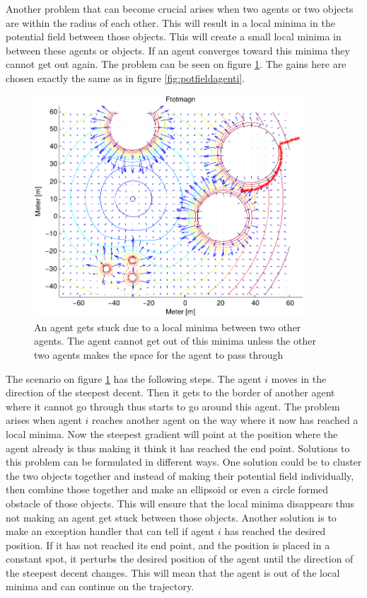 Another problem that can become crucial arises when two agents or two objects are within the radius of each other. This will result in a local minima in the potential field between those objects. This will create a small local minima in between these agents or objects. If an agent converges toward this minima they cannot get out again. The problem can be seen on figure \ref{fig:roevproblem}. The gains here are chosen exactly the same as in figure \ref{fig:potfieldagenti}.
\begin{figure}[htbp]
  \includegraphics[width=0.9\textwidth]{fig/ftotmagnfigpdf3}
  \caption{An agent gets stuck due to a local minima between two other agents. The agent cannot get out of this minima unless the other two agents makes the space for the agent to pass through}
  \label{fig:roevproblem}
\end{figure}
The scenario on figure \ref{fig:roevproblem} has the following steps. The agent $i$ moves in the direction of the steepest decent. Then it gets to the border of another agent where it cannot go through thus starts to go around this agent. The problem arises when agent $i$ reaches another agent on the way where it now has reached a local minima. Now the steepest gradient will point at the position where the agent already is thus making it think it has reached the end point. Solutions to this problem can be formulated in different ways. One solution could be to cluster the two objects together and instead of making their potential field individually, then combine those together and make an ellipsoid or even a circle formed obstacle of those objects. This will ensure that the local minima disappears thus not making an agent get stuck between those objects. Another solution is to make an exception handler that can tell if agent $i$ has reached the desired position. If it has not reached its end point, and the position is placed in a constant spot, it perturbs the desired position of the agent until the direction of the steepest decent changes. This will mean that the agent is out of the local minima and can continue on the trajectory.

